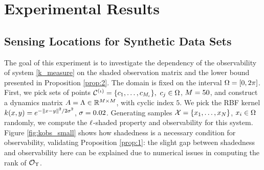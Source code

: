 \section{Experimental Results}
\subsection{Sensing Locations for Synthetic Data Sets}\label{sec:exp}
 The goal of this experiment is to investigate the dependency of the observability of system \eqref{k_measure} on the shaded observation matrix and the lower bound presented in Proposition \ref{prop:2}. The domain is fixed on the interval $\Omega = [0,2\pi]$. First, we pick sets of points $\mathcal{C}^{(\iota)} = \{c_1,\dots,c_{M_{\iota}}\}, \ c_{j}\in\Omega$, $M=50$, and construct a dynamics matrix $A = \Lambda \in {\mathbb{R}^{M\times M}}$, with cyclic index $5$.  We pick the RBF kernel $k(x,y) = e^{-\|x-y\|^2/2\sigma^2}$, $\sigma=0.02$. Generating samples $\mathcal{X}=\{x_1, \dots, x_{N}\}$, $x_{i}\in\Omega$ randomly, we compute the $\ell$-shaded property and observability for this system. Figure \ref{fig:kobs_small} shows how shadedness is a necessary condition for observability, validating Proposition \ref{prop:1}: the slight gap between shadedness and observability here can be explained due to numerical issues in computing the rank of $\mathcal{O}_{\Upsilon}$. 
 
